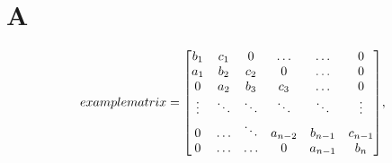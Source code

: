 \onecolumn
\setcounter{equation}{0}
\renewcommand\theequation{A.\arabic{equation}}
\section*{A}
\label{sec:appendix}

  \[examplematrix =
    \mqty[b_1 & c_1 & 0 & \hdots & \hdots & 0 \\
          a_1 & b_2 & c_2 & 0 & \hdots & 0 \\
          0 & a_2 & b_3 & c_3 & \hdots & 0 \\
          \vdots & \ddots & \ddots & \ddots & \ddots & \vdots \\
          0 & \hdots & \ddots & a_{n-2} & b_{n-1} & c_{n-1} \\
          0 & \hdots & \hdots & 0 & a_{n-1} & b_n],
  \]

